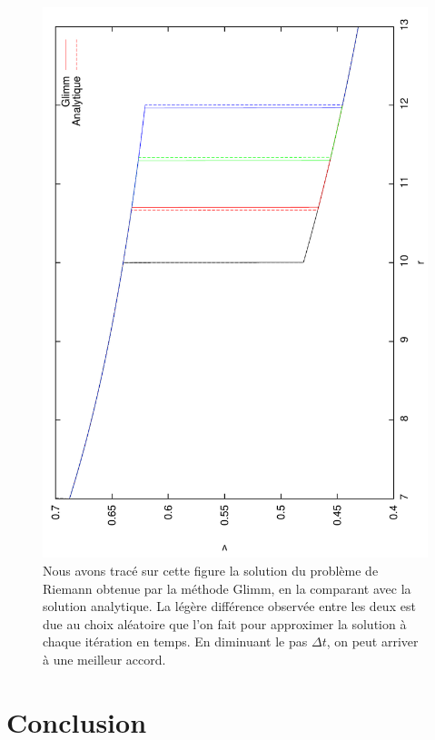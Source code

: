 \documentclass[11pt,a4paper]{article}
\begin{document}
\begin{figure}\centering
\includegraphics[scale=0.4, angle=-90]{figures/choc_glimm.pdf}
\caption{Nous avons tracé sur cette figure la solution du problème de Riemann obtenue par la méthode Glimm, en la comparant avec la solution analytique. La légère différence observée entre les deux est due au choix aléatoire que l'on fait pour approximer la solution à chaque itération en temps. En diminuant le pas $\Delta t$, on peut arriver à une meilleur accord.}
\label{fig:glimm_choc}
\end{figure}

\newpage
\section{Conclusion}
\end{document}
